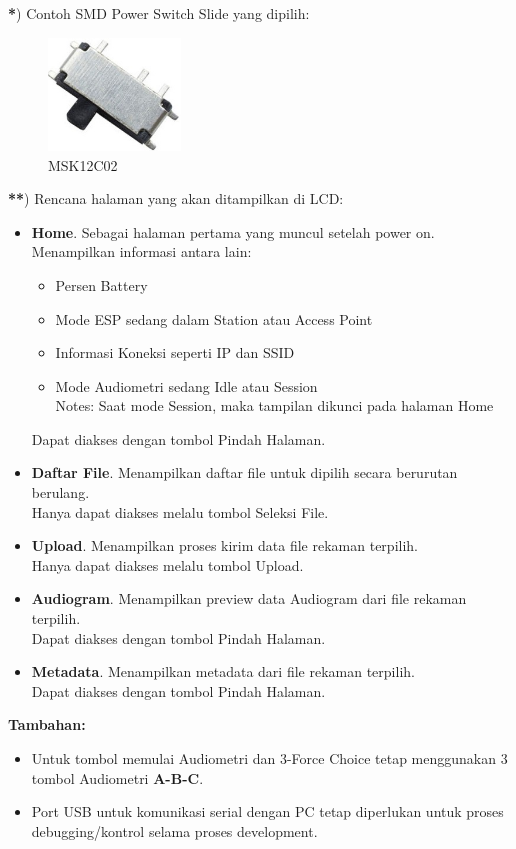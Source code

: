 \documentclass[12pt,]{article}
\begin{document}
	\textbf{*}) Contoh SMD Power Switch Slide yang dipilih:
	
	\begin{figure}[!ht]
		\centering
		\includegraphics[width=100pt]{symbols/msk12c02}
		\caption{MSK12C02}
	\end{figure}

	\textbf{**}) Rencana halaman yang akan ditampilkan di LCD:
	\begin{itemize}
		\item \textbf{Home}. Sebagai halaman pertama yang muncul setelah power on.
		Menampilkan informasi antara lain:
		\begin{itemize}
			\item Persen Battery
			\item Mode ESP sedang dalam Station atau Access Point
			\item Informasi Koneksi seperti IP dan SSID
			\item Mode Audiometri sedang Idle atau Session\\
			Notes: Saat mode Session, maka tampilan dikunci pada halaman Home
		\end{itemize}
		Dapat diakses dengan tombol Pindah Halaman.
	
		\item \textbf{Daftar File}. Menampilkan daftar file untuk dipilih secara berurutan berulang.\\
		Hanya dapat diakses melalu tombol Seleksi File.
		
		\item \textbf{Upload}. Menampilkan proses kirim data file rekaman terpilih.\\
		Hanya dapat diakses melalu tombol Upload.
		
		\item \textbf{Audiogram}. Menampilkan preview data Audiogram dari file rekaman terpilih.\\
		Dapat diakses dengan tombol Pindah Halaman.
		
		\item \textbf{Metadata}. Menampilkan metadata dari file rekaman terpilih.\\
		Dapat diakses dengan tombol Pindah Halaman.
	\end{itemize}

	\textbf{Tambahan:}
	\begin{itemize}
		\item Untuk tombol memulai Audiometri dan 3-Force Choice tetap menggunakan 3 tombol Audiometri \textbf{A-B-C}.
		\item Port USB untuk komunikasi serial dengan PC tetap diperlukan untuk proses debugging/kontrol selama proses development.
	\end{itemize}
\end{document}
